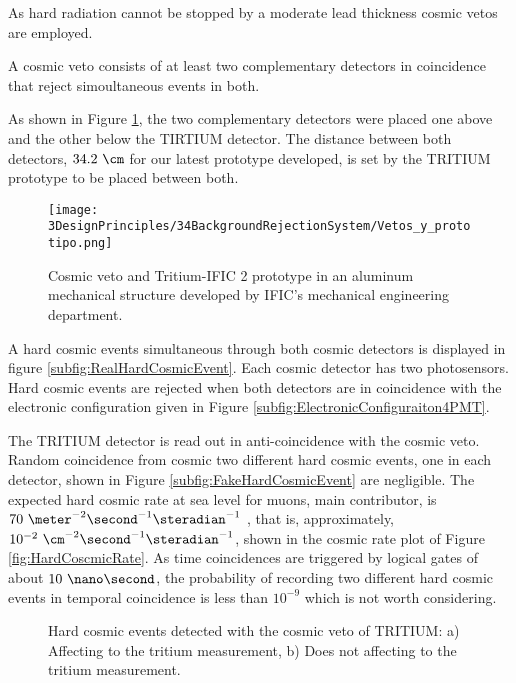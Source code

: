 As hard radiation cannot be stopped by a moderate lead thickness cosmic vetos are employed.

A cosmic veto consists of at least two complementary detectors in coincidence that reject simoultaneous events in both. 

As shown in Figure \ref{fig:VetoAndPrototype}, the two complementary detectors were placed one above and the other below the TIRTIUM detector. The distance between both detectors, $34.2~\cm$ for our latest prototype developed, is set by the TRITIUM prototype to be placed between both.

\begin{figure}[h]
\centering
\texttt{[image: 3DesignPrinciples/34BackgroundRejectionSystem/Vetos\_y\_prototipo.png]}
\caption{Cosmic veto and Tritium-IFIC 2 prototype in an aluminum mechanical structure developed by IFIC's mechanical engineering department.\label{fig:VetoAndPrototype}}
\end{figure}


A hard cosmic events simultaneous through both cosmic detectors is displayed in figure \ref{subfig:RealHardCosmicEvent}. Each cosmic detector has two photosensors. Hard cosmic events are rejected when both detectors are in coincidence with the electronic configuration given in Figure \ref{subfig:ElectronicConfiguraiton4PMT}. 

The TRITIUM detector is read out in anti-coincidence with the cosmic veto.  Random coincidence from cosmic two different hard cosmic events, one in each detector, shown in Figure \ref{subfig:FakeHardCosmicEvent} are negligible. The expected hard cosmic rate at sea level for muons, main contributor, is $70~\meter^{-2}\second^{-1}\steradian^{-1}$ \cite{PDG, HardCosmicMuonRate}, that is, approximately, $10^{-2}~\cm^{-2}\second^{-1}\steradian^{-1}$, shown in the cosmic rate plot of Figure \ref{fig:HardCoscmicRate}. As time coincidences are triggered by logical gates of about $10~\nano\second$, the probability of recording two different hard cosmic events in temporal coincidence is less than $10^{-9}$ which is not worth considering.

\begin{figure}[h]
 \centering
   \caption{Hard cosmic events detected with the cosmic veto of TRITIUM: a) Affecting to the tritium measurement, b) Does not affecting to the tritium measurement.}
 \label{fig:HardCosmicEventsSimulation}
\end{figure}

